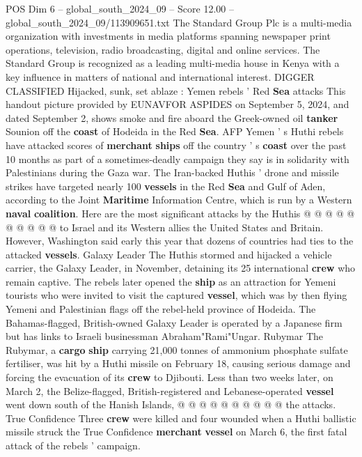 \begin{textsample}{POS Dim 6 – global\_south\_2024\_09 – Score 12.00 – global\_south\_2024\_09/113909651.txt}  \label{ex:f6_pos_417}
The Standard Group Plc is a multi-media organization with investments in media platforms spanning newspaper print operations, television, radio broadcasting, digital and online services.
The Standard Group is recognized as a leading multi-media house in Kenya with a key influence in matters of national and international interest.
DIGGER CLASSIFIED Hijacked, sunk, set ablaze : Yemen rebels ' Red \textbf{Sea} attacks This handout picture provided by EUNAVFOR ASPIDES on September 5, 2024, and dated September 2, shows smoke and fire aboard the Greek-owned oil \textbf{tanker} Sounion off the \textbf{coast} of Hodeida in the Red \textbf{Sea}.
AFP Yemen ' s Huthi rebels have attacked scores of \textbf{merchant} \textbf{ships} off the country ' s \textbf{coast} over the past 10 months as part of a sometimes-deadly campaign they say is in solidarity with Palestinians during the Gaza war.
The Iran-backed Huthis ' drone and missile strikes have targeted nearly 100 \textbf{vessels} in the Red \textbf{Sea} and Gulf of Aden, according to the Joint \textbf{Maritime} Information Centre, which is run by a Western \textbf{naval} \textbf{coalition}.
Here are the most significant attacks by the Huthis @ @ @ @ @ @ @ @ @ @ to Israel and its Western allies the United States and Britain.
However, Washington said early this year that dozens of countries had ties to the attacked \textbf{vessels}.
Galaxy Leader The Huthis stormed and hijacked a vehicle carrier, the Galaxy Leader, in November, detaining its 25 international \textbf{crew} who remain captive.
The rebels later opened the \textbf{ship} as an attraction for Yemeni tourists who were invited to visit the captured \textbf{vessel}, which was by then flying Yemeni and Palestinian flags off the rebel-held province of Hodeida.
The Bahamas-flagged, British-owned Galaxy Leader is operated by a Japanese firm but has links to Israeli businessman Abraham"Rami"Ungar.
Rubymar The Rubymar, a \textbf{cargo} \textbf{ship} carrying 21,000 tonnes of ammonium phosphate sulfate fertiliser, was hit by a Huthi missile on February 18, causing serious damage and forcing the evacuation of its \textbf{crew} to Djibouti.
Less than two weeks later, on March 2, the Belize-flagged, British-registered and Lebanese-operated \textbf{vessel} went down south of the Hanish Islands, @ @ @ @ @ @ @ @ @ @ the attacks.
True Confidence Three \textbf{crew} were killed and four wounded when a Huthi ballistic missile struck the True Confidence \textbf{merchant} \textbf{vessel} on March 6, the first fatal attack of the rebels ' campaign.

\end{textsample}
